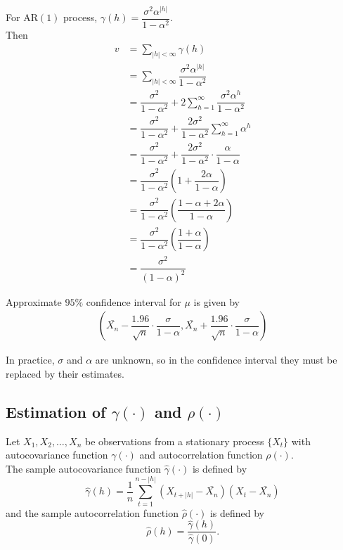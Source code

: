 \documentclass[11pt, a4paper]{article}
\numberwithin{equation}{section}
\theoremstyle{definition}
\begin{document}
For AR$(1)$ process, $\gamma(h) = \dfrac{\sigma^2 \alpha^{|h|}}{1-\alpha^2}$. \\[0.25em]

Then 
\begin{align*}
v &= \sum \limits_{|h| < \infty} \gamma(h) \\[0.25em]
&= \sum \limits_{|h| < \infty} \dfrac{\sigma^2 \alpha^{|h|}}{1-\alpha^2} \\[0.25em]
&= \dfrac{\sigma^2}{1-\alpha^2} + 2\sum \limits_{h = 1}^{\infty} \dfrac{\sigma^2 \alpha^h}{1-\alpha^2} \\[0.25em]
&= \dfrac{\sigma^2}{1-\alpha^2} + \dfrac{2\sigma^2}{1-\alpha^2} \sum \limits_{h = 1}^{\infty} \alpha^h \\[0.25em]
&= \dfrac{\sigma^2}{1-\alpha^2} + \dfrac{2\sigma^2}{1-\alpha^2} \cdot \dfrac{\alpha}{1-\alpha} \\[0.25em]
&= \dfrac{\sigma^2}{1-\alpha^2} \left( 1 + \dfrac{2\alpha}{1-\alpha} \right) \\[0.25em]
&= \dfrac{\sigma^2}{1-\alpha^2} \left( \dfrac{1 - \alpha + 2\alpha}{1-\alpha} \right) \\[0.25em]
&= \dfrac{\sigma^2}{1-\alpha^2} \left( \dfrac{1 + \alpha}{1 - \alpha} \right) \\[0.25em]
&= \dfrac{\sigma^2}{(1-\alpha)^2}
\end{align*}

Approximate $95\%$ confidence interval for $\mu$ is given by 
\begin{align*}
\left( \bar{X_n} - \dfrac{1.96}{\sqrt{n}} \cdot \dfrac{\sigma}{1-\alpha}, \bar{X_n} + \dfrac{1.96}{\sqrt{n}} \cdot \dfrac{\sigma}{1-\alpha} \right)
\end{align*}

In practice, $\sigma$ and $\alpha$ are unknown, so in the confidence interval they must be replaced by their estimates.

\subsection{Estimation of $\gamma(\cdot)$ and $\rho(\cdot)$}

Let $X_1, X_2, \ldots, X_n$ be observations from a stationary process $\{X_t\}$ with autocovariance function $\gamma(\cdot)$ and autocorrelation function $\rho(\cdot)$. \\[0.25em]

The sample autocovariance function $\hat{\gamma}(\cdot)$ is defined by
\begin{equation}\label{sampleautocovariance}
\hat{\gamma}(h) = \dfrac{1}{n} \sum \limits_{t = 1}^{n - |h|} \left( X_{t+|h|} - \bar{X_n} \right) \left( X_t - \bar{X_n} \right)
\end{equation}
and the sample autocorrelation function $\hat{\rho}(\cdot)$ is defined by
\begin{equation}\label{sampleautocorrelation}
\hat{\rho}(h) = \dfrac{\hat{\gamma}(h)}{\hat{\gamma}(0)}.
\end{equation}
\end{document}
